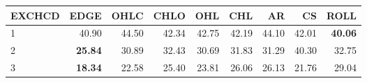 \begin{table}[ht]
\centering
\begin{tabular}{lrrrrrrrr}
  \hline
EXCHCD & EDGE & OHLC & CHLO & OHL & CHL & AR & CS & ROLL \\ 
  \hline
1 & 40.90 & 44.50 & 42.34 & 42.75 & 42.19 & 44.10 & 42.01 & \textbf{40.06} \\ 
  2 & \textbf{25.84} & 30.89 & 32.43 & 30.69 & 31.83 & 31.29 & 40.30 & 32.75 \\ 
  3 & \textbf{18.34} & 22.58 & 25.40 & 23.81 & 26.06 & 26.13 & 21.76 & 29.04 \\ 
   \hline
\end{tabular}
\end{table}
